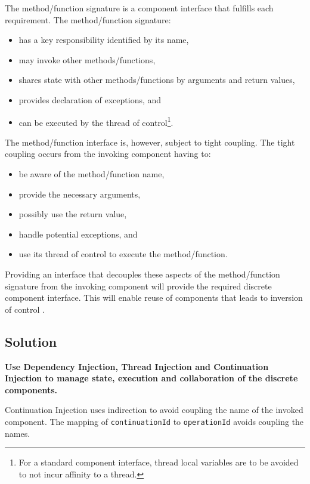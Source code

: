 \documentclass[prodmode]{style/acmlarge}
\begin{document}
The method/function signature is a component interface that fulfills each
requirement.  The method/function signature:
\begin{itemize}
  \item has a key responsibility identified by its name,
  \item may invoke other methods/functions,
  \item shares state with other methods/functions by arguments and return values,
  \item provides declaration of exceptions, and
  \item can be executed by the thread of control\footnote{For a standard component interface, thread local variables are to be avoided to not incur affinity to a thread.}.
\end{itemize}

The method/function interface is, however, subject to tight coupling.  The tight
coupling occurs from the invoking component having to:
\begin{itemize}
  \item be aware of the method/function name,
  \item provide the necessary arguments,
  \item possibly use the return value,
  \item handle potential exceptions, and
  \item use its thread of control to execute the method/function.
\end{itemize}

Providing an interface that decouples these aspects of the method/function
signature from the invoking component will provide the required discrete
component interface. This will enable reuse of components that leads to
inversion of control \cite[p. 27]{gof}.


\subsection{Solution}

\textbf{Use Dependency Injection, Thread Injection and Continuation Injection to manage state, execution and collaboration of the discrete components.}

Continuation Injection uses indirection to avoid coupling the name of the
invoked component.  The mapping of \texttt{continuationId} to
\texttt{operationId} avoids coupling the names.
\end{document}
